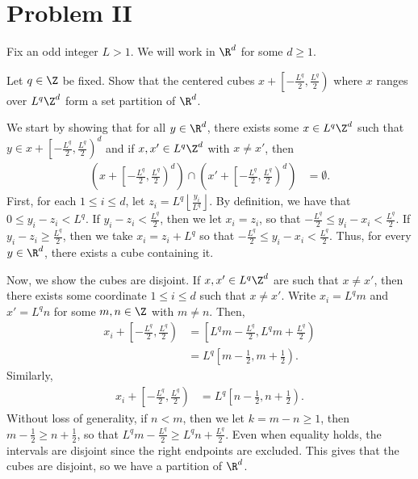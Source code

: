 \documentclass[10pt]{mypackage}
\begin{document}
\section{Problem II}%
Fix an odd integer $L > 1$. We will work in $\R^d$ for some $d\geq 1$.
\begin{problem}[Problem II.1]
  Let $q\in \Z$ be fixed. Show that the centered cubes $x + \left[ -\frac{L^q}{2},\frac{L^q}{2} \right)$ where $x$ ranges over $L^{q}\Z^d$ form a set partition of $\R^d$.
\end{problem}
\begin{solution}
  We start by showing that for all $y\in \R^d$, there exists some $x\in L^q\Z^d$ such that $y\in x + \left[ -\frac{L^q}{2},\frac{L^q}{2} \right)^d$ and if $x,x'\in L^q\Z^d$ with $x\neq x'$, then
  \begin{align*}
    \left( x + \left[ -\frac{L^q}{2},\frac{L^q}{2} \right)^d \right) \cap \left( x' + \left[ -\frac{L^q}{2},\frac{L^q}{2} \right)^d \right) &= \emptyset.
  \end{align*}
  First, for each $1\leq i \leq d$, let $z_i = L^q\left\lfloor \frac{y_i}{L^q}\right\rfloor$. By definition, we have that $0\leq y_i-z_i < L^q$. If $y_i-z_i < \frac{L^q}{2}$, then we let $x_i = z_i$, so that $-\frac{L^q}{2} \leq y_i-x_i < \frac{L^q}{2}$. If $y_i- z_i \geq \frac{L^q}{2}$, then we take $x_i = z_i + L^q$ so that $-\frac{L^q}{2} \leq y_i-x_i < \frac{L^q}{2}$. Thus, for every $y\in \R^d$, there exists a cube containing it.

  Now, we show the cubes are disjoint. If $x,x'\in L^q\Z^d$ are such that $x\neq x'$, then there exists some coordinate $1\leq i \leq d$ such that $x\neq x'$. Write $x_i = L^qm$ and $x' = L^qn$ for some $m,n\in \Z$ with $m\neq n$. Then,
  \begin{align*}
    x_i + \left[ -\frac{L^q}{2},\frac{L^q}{2} \right) &= \left[ L^qm-\frac{L^q}{2},L^qm + \frac{L^q}{2} \right)\\
                                                      &= L^q\left[ m-\frac{1}{2},m + \frac{1}{2} \right).
  \end{align*}
  Similarly,
  \begin{align*}
    x_i + \left[ -\frac{L^q}{2},\frac{L^q}{2} \right) &= L^q\left[ n-\frac{1}{2},n + \frac{1}{2} \right).
  \end{align*}
  Without loss of generality, if $n < m$, then we let $k = m-n\geq 1$, then $m-\frac{1}{2}\geq n + \frac{1}{2}$, so that $L^qm - \frac{L^q}{2} \geq L^qn + \frac{L^q}{2}$. Even when equality holds, the intervals are disjoint since the right endpoints are excluded. This gives that the cubes are disjoint, so we have a partition of $\R^d$.
\end{solution}
\end{document}
